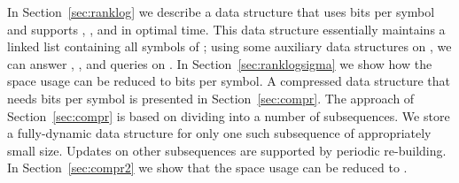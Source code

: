 \documentclass[11pt]{article}\usepackage{fullpage}
\begin{document}
\begin{table}[tb]
  \centering
{}
  \caption{Previous and New Results for Fully-Dynamic Sequences. The rightmost column indicates whether updates are amortized (A) or worst-case (W). We use notation  in this table.}
  \label{tab:ranksel}
\end{table}


In Section~\ref{sec:ranklog} we describe a data structure that uses  bits per symbol and supports , , and  in optimal  time. This data structure essentially maintains a linked list  containing 
all symbols of ; using some auxiliary data structures on , we can answer  , , and  queries on . 
In Section~\ref{sec:ranklogsigma} we show how the space usage can be reduced to  bits per symbol. A compressed data structure that needs  bits per symbol is presented in Section~\ref{sec:compr}.  The approach of Section~\ref{sec:compr} is based on dividing  into a number of subsequences. We store a fully-dynamic data structure for only one such subsequence of appropriately small size.  Updates on other subsequences are supported by periodic re-building.
 In Section~\ref{sec:compr2} we show that the space usage can be reduced to . 
\end{document}
